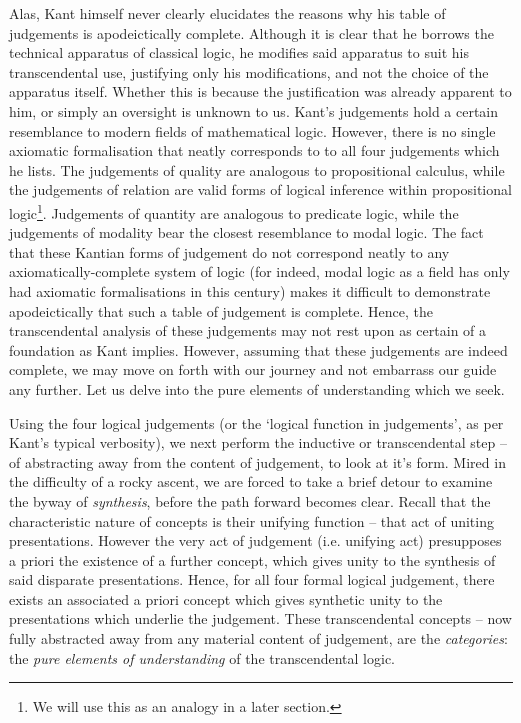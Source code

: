 \noindent
Alas, Kant himself never clearly elucidates the reasons why his table of judgements is apodeictically complete. Although it is clear that he borrows the technical apparatus of classical logic, he modifies said apparatus to suit his transcendental use, justifying only his modifications, and not the choice of the apparatus itself. Whether this is because the justification was already apparent to him, or simply an oversight is unknown to us. Kant's judgements hold a certain resemblance to modern fields of mathematical logic. However, there is no single axiomatic formalisation that neatly corresponds to to all four judgements which he lists. The judgements of quality are analogous to propositional calculus, while the judgements of relation are valid forms of logical inference within propositional logic\footnote{We will use this as an analogy in a later section.}. Judgements of quantity are analogous to predicate logic, while the judgements of modality bear the closest resemblance to modal logic. The fact that these Kantian forms of judgement do not correspond neatly to any axiomatically-complete system of logic (for indeed, modal logic as a field has only had axiomatic formalisations in this century) makes it difficult to demonstrate apodeictically that such a table of judgement is complete. Hence, the transcendental analysis of these judgements may not rest upon as certain of a foundation as Kant implies. However, assuming that these judgements are indeed complete, we may move on forth with our journey and not embarrass our guide any further. Let us delve into the pure elements of understanding which we seek.

Using the four logical judgements (or the `logical function in judgements', as per Kant's typical verbosity), we next perform the inductive or transcendental step -- of abstracting away from the content of judgement, to look at it's form. Mired in the difficulty of a rocky ascent, we are forced to take a brief detour to examine the byway of \emph{synthesis}, before the path forward becomes clear. Recall that the characteristic nature of concepts is their unifying function -- that act of uniting presentations. However the very act of judgement (i.e. unifying act) presupposes a priori the existence of a further concept, which gives unity to the synthesis of said disparate presentations. Hence, for all four formal logical judgement, there exists an associated a priori concept which gives synthetic unity to the presentations which underlie the judgement. These transcendental concepts -- now fully abstracted away from any material content of judgement, are the \emph{categories}: the \emph{pure elements of understanding} of the transcendental logic.

